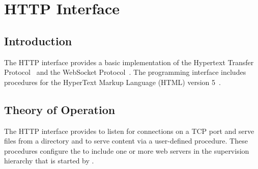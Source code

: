 %
%
%


\chapter {HTTP Interface}\label{chap:http}

\section {Introduction}

The HTTP interface provides a basic implementation of the Hypertext
Transfer Protocol~\cite{RFC7230} and the WebSocket
Protocol~\cite{RFC6455}. The programming interface includes procedures
for the HyperText Markup Language (HTML) version 5~\cite{html5}.

\section {Theory of Operation}

The HTTP interface provides  to listen for
connections on a TCP port and serve files from a directory and
 to serve content via a user-defined
procedure. These procedures configure the  to
include one or more web servers in the supervision hierarchy that is
started by .

